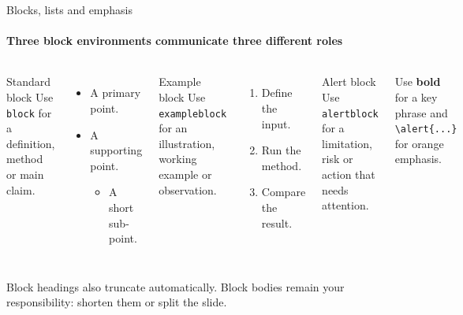 \documentclass[aspectratio=169,10pt]{beamer}
\begin{document}
\begin{frame}{Blocks, lists and emphasis}
  \framesubtitle{Three block environments communicate three different roles}
  \begin{columns}[T,onlytextwidth]
      \begin{block}{Standard block}
        Use \texttt{block} for a definition, method or main claim.
      \end{block}
      \small
      \begin{itemize}
        \item A primary point.
        \item A supporting point.
          \begin{itemize}
            \item A short sub-point.
          \end{itemize}
      \end{itemize}
      \begin{exampleblock}{Example block}
        Use \texttt{exampleblock} for an illustration, working example or observation.
      \end{exampleblock}
      \small
      \begin{enumerate}
        \item Define the input.
        \item Run the method.
        \item Compare the result.
      \end{enumerate}
      \begin{alertblock}{Alert block}
        Use \texttt{alertblock} for a limitation, risk or action that needs attention.
      \end{alertblock}
      \small Use \textbf{bold} for a key phrase and \alert{\texttt{\textbackslash alert\{...\}}} for orange emphasis.
  \end{columns}
  \vfill
  \textcolor{DASEslate}{\scriptsize Block headings also truncate automatically. Block bodies remain your responsibility: shorten them or split the slide.}
\end{frame}
\end{document}
